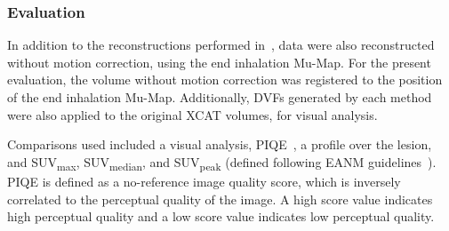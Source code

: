             \subsubsection{Evaluation} \label{sec:evaluation_of_pet_ct_motion_correction_incorporating_motion_models_using_mlacf_and_complex_gating_schemes_methods_evaluation}
                In addition to the reconstructions performed in~, data were also reconstructed without motion correction, using the end inhalation \gls{Mu-Map}. For the present evaluation, the volume without motion correction was registered to the position of the end inhalation \gls{Mu-Map}. Additionally, \glspl{DVF} generated by each method were also applied to the original \gls{XCAT} volumes, for visual analysis.
                
                Comparisons used included a visual analysis, \gls{PIQE}~\parencite{Chan2000Psychovisually-basedImages}, a profile over the lesion, and \gls{SUV}\textsubscript{max}, \gls{SUV}\textsubscript{median}, and \gls{SUV}\textsubscript{peak} (defined following \gls{EANM} guidelines~\parencite{Boellaard2015FDG2.0}). \gls{PIQE} is defined as a no-reference image quality score, which is inversely correlated to the perceptual quality of the image. A high score value indicates high perceptual quality and a low score value indicates low perceptual quality.
                
        
